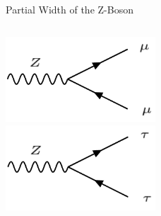 \begin{frame}{Partial Width of the Z-Boson}
\begin{columns}
\begin{column}{0.5\textwidth}
                \includegraphics[width = 0.42\textwidth]{content/images/Zdecay_mumu.png} \\
                \includegraphics[width = 0.42\textwidth]{content/images/Zdecay_tautau.png}
            \end{column}
        \end{columns}
    \end{frame}
